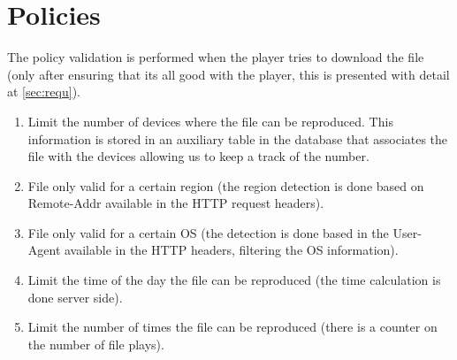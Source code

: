 \documentclass[11pt,a4paper]{report}
\begin{document}
\chapter{Policies}
The policy validation is performed when the player tries to download the file (only after ensuring that its all good with the player, this is presented with detail at  \autoref{sec:requ}).
\begin{enumerate}
\item Limit the number of devices where the file can be reproduced. This information is stored in an auxiliary table in the database that associates the file with the devices allowing us to keep a track of the number.
\item File only valid for a certain region (the region detection is done based on Remote-Addr available in the HTTP request headers).
\item File only valid for a certain OS (the detection is done based in the User-Agent available in the HTTP headers, filtering the OS information).
\item Limit the time of the day the file can be reproduced (the time calculation is done server side).
\item Limit the number of times the file can be reproduced (there is a counter on the number of file plays).
\end{enumerate}
\end{document}
